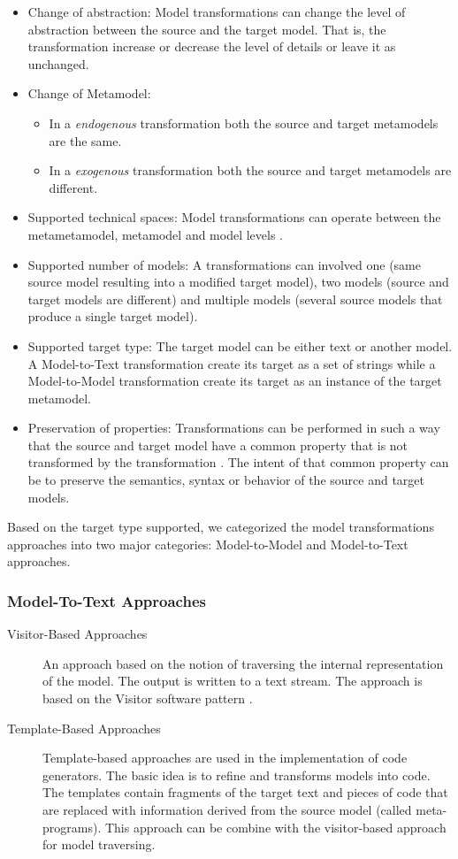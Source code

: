 \begin{itemize}
\item Change of abstraction: Model transformations can change the level of abstraction between the source and the target model. That is, the transformation increase or decrease the level of details or leave it as unchanged.
\item Change of Metamodel: 
	\begin{itemize}
		\item In a \textit{endogenous} \cite{Visser2005} transformation both the source and target metamodels are 			the same.
		\item In a \textit{exogenous} \cite{Visser2005} transformation both the source and target metamodels are 			different.
	\end{itemize}
\item Supported technical spaces: Model transformations can operate between the metametamodel, metamodel and model levels \cite{OOPSLA2004Bezivin}. 
\item Supported number of models: A transformations can involved one (same source model resulting into a modified target model), two models (source and target models are different) and multiple models (several source models that produce a single target model).
\item Supported target type: The target model can be either text or another model. A Model-to-Text transformation create its target as a set of strings while a  Model-to-Model transformation create its target as an instance of the target metamodel.
\item Preservation of properties: Transformations can be performed in such a way that the source and target model have a common property that is not transformed by the transformation \cite{biehl2010literature}. The intent of that common property can be to preserve the semantics, syntax or behavior of the source and target models. 
\end{itemize}

Based on the target type supported, we categorized the model transformations approaches into two major categories\cite{Czarnecki2006}: Model-to-Model and Model-to-Text approaches. 

\subsubsection{Model-To-Text Approaches}
\begin{description}
\item[Visitor-Based Approaches]
An approach based on the notion of traversing the internal representation of the model. The output is written to a text stream. The approach is based on the Visitor software pattern \cite{gamma1994design}. 
\item[Template-Based Approaches]
Template-based approaches are used in the implementation of code generators. The basic idea is to refine and transforms models into code. The templates contain fragments of the target text and pieces of code that are replaced with information derived from the source model (called meta-programs). This approach can be combine with the visitor-based approach for model traversing. 
\end{description}

